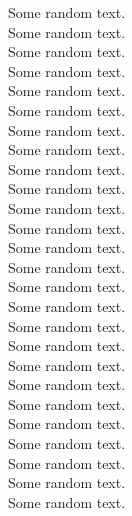 Some random text.\\
Some random text.\\
Some random text.\\
Some random text.\\
Some random text.\\
Some random text.\\
Some random text.\\
Some random text.\\
Some random text.\\
Some random text.\\
Some random text.\\
Some random text.\\
Some random text.\\
Some random text.\\
Some random text.\\
Some random text.\\
Some random text.\\
Some random text.\\
Some random text.\\
Some random text.\\
Some random text.\\
Some random text.\\
Some random text.\\
Some random text.\\
Some random text.\\
Some random text.\\
  